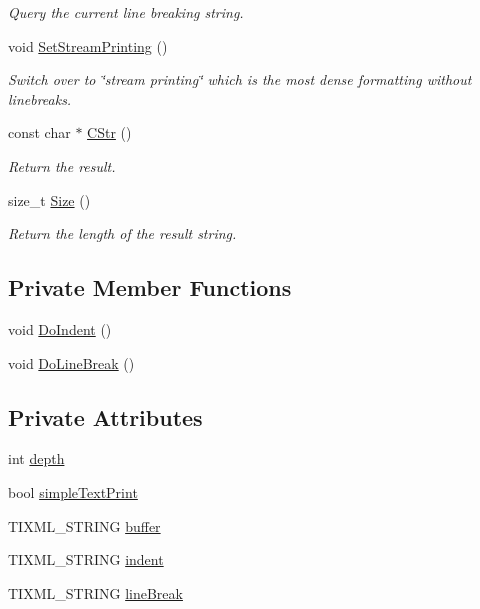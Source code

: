\begin{DoxyCompactItemize}
\begin{DoxyCompactList}\small\item\em Query the current line breaking string. \item\end{DoxyCompactList}\item 
void \hyperlink{classTiXmlPrinter_ab23a90629e374cb1cadca090468bbd19}{SetStreamPrinting} ()
\begin{DoxyCompactList}\small\item\em Switch over to \char`\"{}stream printing\char`\"{} which is the most dense formatting without linebreaks. \item\end{DoxyCompactList}\item 
const char $\ast$ \hyperlink{classTiXmlPrinter_a859eede9597d3e0355b77757be48735e}{CStr} ()
\begin{DoxyCompactList}\small\item\em Return the result. \item\end{DoxyCompactList}\item 
size\_\-t \hyperlink{classTiXmlPrinter_ad01375ae9199bd2f48252eaddce3039d}{Size} ()
\begin{DoxyCompactList}\small\item\em Return the length of the result string. \item\end{DoxyCompactList}\end{DoxyCompactItemize}
\subsection*{Private Member Functions}
\begin{DoxyCompactItemize}
\item 
void \hyperlink{classTiXmlPrinter_a348ad6527b1d43ddeb51454cddeb6a1d}{DoIndent} ()
\item 
void \hyperlink{classTiXmlPrinter_a252a0e13e06def9a06b2eb30a04677a0}{DoLineBreak} ()
\end{DoxyCompactItemize}
\subsection*{Private Attributes}
\begin{DoxyCompactItemize}
\item 
int \hyperlink{classTiXmlPrinter_a7e11330449daea912320c22f84387df7}{depth}
\item 
bool \hyperlink{classTiXmlPrinter_a2dceede5ae9bb8948f1ecaabb24ab2fb}{simpleTextPrint}
\item 
TIXML\_\-STRING \hyperlink{classTiXmlPrinter_ae6cc56c79e52ef352ecc612809fdbedf}{buffer}
\item 
TIXML\_\-STRING \hyperlink{classTiXmlPrinter_a672fda389bb3f5a2ae8ead867f9a2536}{indent}
\item 
TIXML\_\-STRING \hyperlink{classTiXmlPrinter_a25e8120bcfda10cc06a11b2dedcef7fe}{lineBreak}
\end{DoxyCompactItemize}


